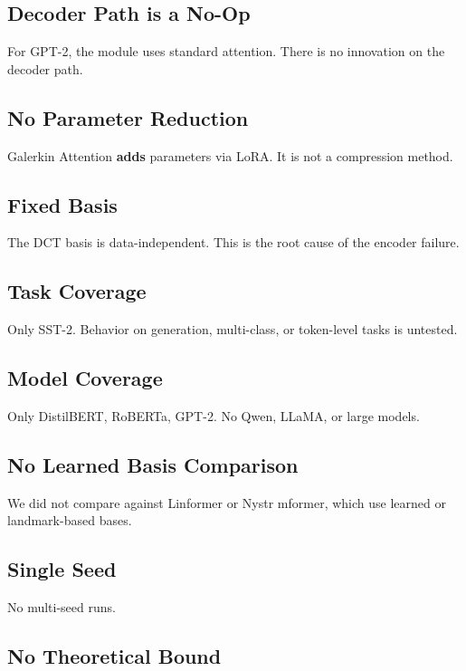 \subsection{Decoder Path is a No-Op}

For GPT-2, the module uses standard attention. There is no innovation on 
the decoder path.

\subsection{No Parameter Reduction}

Galerkin Attention \textbf{adds} parameters via LoRA. It is not a compression 
method.

\subsection{Fixed Basis}

The DCT basis is data-independent. This is the root cause of the encoder 
failure.

\subsection{Task Coverage}

Only SST-2. Behavior on generation, multi-class, or token-level tasks 
is untested.

\subsection{Model Coverage}

Only DistilBERT, RoBERTa, GPT-2. No Qwen, LLaMA, or large models.

\subsection{No Learned Basis Comparison}

We did not compare against Linformer or Nystr mformer, which use learned 
or landmark-based bases.

\subsection{Single Seed}

No multi-seed runs.

\subsection{No Theoretical Bound}

